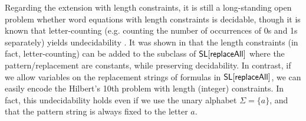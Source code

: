 
Regarding the extension with length constraints, it is still a long-standing
open problem whether word equations with length constraints is decidable, though
it is known that letter-counting (e.g. counting the number of occurrences of 0s
and 1s separately) yields undecidability \cite{buchi}. It was shown in
\cite{LB16} that the length constraints (in fact, letter-counting) can be
added to the subclass of $\mathsf{SL}[\mathsf{replaceAll}]$ where the pattern/replacement 
are constants, while preserving decidability. In contrast, if we allow 
variables on the replacement strings of formulas in $\mathsf{SL}[\mathsf{replaceAll}]$,
we can easily encode the Hilbert's 10th problem with length (integer) 
constraints. In fact, this undecidability holds even if we use the unary
alphabet $\Sigma = \{a\}$, and that the pattern string is
always fixed to the letter $a$.



%


